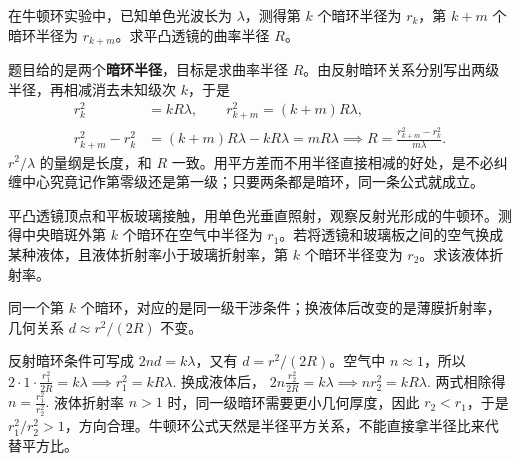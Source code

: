 \begin{exercise}[牛顿环测曲率半径]
在牛顿环实验中，已知单色光波长为 \(\lambda\)，测得第 \(k\) 个暗环半径为 \(r_k\)，第 \(k+m\) 个暗环半径为 \(r_{k+m}\)。求平凸透镜的曲率半径 \(R\)。
\end{exercise}

\begin{solution}
题目给的是两个\textbf{暗环半径}，目标是求曲率半径 \(R\)。由反射暗环关系分别写出两级半径，再相减消去未知级次 \(k\)，于是
\[
\begin{aligned}
r_k^2&=kR\lambda,\qquad r_{k+m}^2=(k+m)R\lambda,\\
r_{k+m}^2-r_k^2&=(k+m)R\lambda-kR\lambda=mR\lambda
\implies
R=\frac{r_{k+m}^2-r_k^2}{m\lambda}.
\end{aligned}
\]
\(r^2/\lambda\) 的量纲是长度，和 \(R\) 一致。用平方差而不用半径直接相减的好处，是不必纠缠中心究竟记作第零级还是第一级；只要两条都是暗环，同一条公式就成立。
\end{solution}

\begin{exercise}[空气换成液体后牛顿环半径怎样反推折射率]
平凸透镜顶点和平板玻璃接触，用单色光垂直照射，观察反射光形成的牛顿环。测得中央暗斑外第 \(k\) 个暗环在空气中半径为 \(r_1\)。若将透镜和玻璃板之间的空气换成某种液体，且液体折射率小于玻璃折射率，第 \(k\) 个暗环半径变为 \(r_2\)。求该液体折射率。
\end{exercise}

\begin{solution}
同一个第 \(k\) 个暗环，对应的是同一级干涉条件；换液体后改变的是薄膜折射率，几何关系 \(d\approx r^2/(2R)\) 不变。

反射暗环条件可写成 \(2nd=k\lambda\)，又有 \(d=r^2/(2R)\)。空气中 \(n\approx1\)，所以
 \(2\cdot 1\cdot \frac{r_1^2}{2R}=k\lambda \implies r_1^2=kR\lambda.\) 
换成液体后，
 \(2n\frac{r_2^2}{2R}=k\lambda \implies nr_2^2=kR\lambda.\) 
两式相除得
 \(n=\frac{r_1^2}{r_2^2}.\) 
液体折射率 \(n>1\) 时，同一级暗环需要更小几何厚度，因此 \(r_2<r_1\)，于是 \(r_1^2/r_2^2>1\)，方向合理。牛顿环公式天然是半径平方关系，不能直接拿半径比来代替平方比。
\end{solution}

